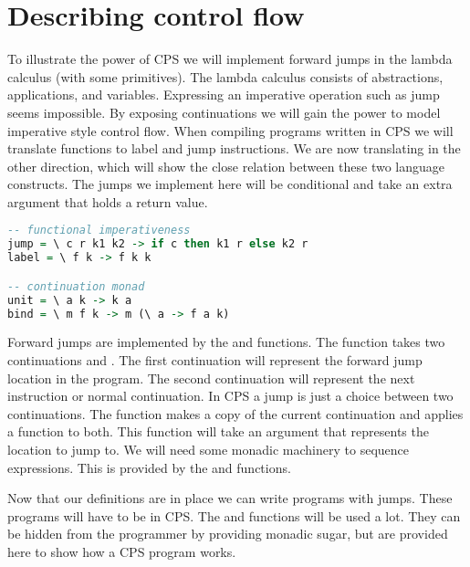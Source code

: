 \section{\label{section:dcflow}Describing control flow}
To illustrate the power of \ac{CPS} we will implement forward jumps in the lambda calculus (with some primitives). The lambda calculus consists of abstractions, applications, and variables. Expressing an imperative operation such as jump seems impossible. By exposing continuations we will gain the power to model imperative style control flow. When compiling programs written in \ac{CPS} we will translate functions to label and jump instructions. We are now translating in the other direction, which will show the close relation between these two language constructs. The jumps we implement here will be conditional and take an extra argument that holds a return value. 

\begin{lstlisting}[language=Haskell]
-- functional imperativeness
jump = \ c r k1 k2 -> if c then k1 r else k2 r
label = \ f k -> f k k

-- continuation monad
unit = \ a k -> k a
bind = \ m f k -> m (\ a -> f a k)
\end{lstlisting}

Forward jumps are implemented by the  and  functions. The  function takes two continuations  and . The first continuation will represent the forward jump location in the program. The second continuation will represent the next instruction or normal continuation. In \ac{CPS} a jump is just a choice between two continuations. The  function makes a copy of the current continuation and applies a function to both. This function  will take an argument that represents the location to jump to. We will need some monadic machinery to sequence expressions. This is provided by the  and  functions\autocite{DBLP:conf/popl/Wadler92}.

Now that our definitions are in place we can write programs with jumps. These programs will have to be in \ac{CPS}. The  and  functions will be used a lot. They can be hidden from the programmer by providing monadic sugar, but are provided here to show how a \ac{CPS} program works.

